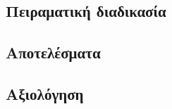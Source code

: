 \subsection{Πειραματική διαδικασία}
\label{subsection:02_03_04:01}

\subsection{Αποτελέσματα}
\label{subsection:02_03_04:02}

\subsection{Αξιολόγηση}
\label{subsection:02_03_04:03}
